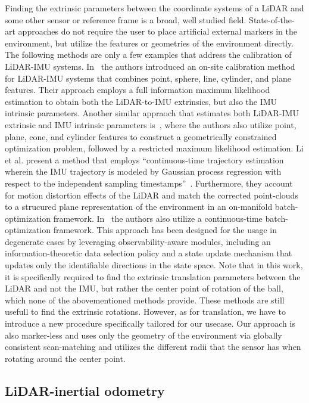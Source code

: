 Finding the extrinsic parameters between the coordinate systems of a LiDAR and some other sensor or reference frame is a broad, well studied field.
State-of-the-art approaches do not require the user to place artificial external markers in the environment, but utilize the features or geometries of the environment directly.
The following methods are only a few examples that address the calibration of LiDAR-IMU systems.
In~\cite{Liu2020NovelMultifeature} the authors introduced an on-site calibration method for LiDAR-IMU systems that combines point, sphere, line, cylinder, and plane features.
Their approach employs a full information maximum likelihood estimation to obtain both the LiDAR-to-IMU extrinsics, but also the IMU intrinsic parameters.
Another similar appraoch that estimates both LiDAR-IMU extrinsic and IMU intrinsic parameters is~\cite{Liu2019ErrorModeling}, where the authors also utilize point, plane, cone, and cylinder features to construct a geometrically constrained optimization problem, followed by a restricted maximum likelihood estimation.
Li et al. present a method that employs ``continuous-time trajectory estimation wherein the IMU trajectory is modeled by Gaussian process regression with respect to the independent sampling timestamps''~\cite{Li2021CTTrajectory}.
Furthermore, they account for motion distortion effects of the LiDAR and match the corrected point-clouds to a strucured plane representation of the environment in an on-manifold batch-optimization framework.
In~\cite{Lv2022ObservabilityAware} the authors also utilize a continuous-time batch-optimization framework.
This approach has been designed for the usage in degenerate cases by leveraging observability-aware modules, including an information-theoretic data selection policy and a state update mechanism that updates only the identifiable directions in the state space.
Note that in this work, it is specifically required to find the extrinsic translation parameters between the LiDAR and not the IMU, but rather the center point of rotation of the ball, which none of the abovementioned methods provide. 
These methods are still usefull to find the extrinsic rotations.
However, as for translation, we have to introduce a new procedure specifically tailored for our usecase.
Our approach is also marker-less and uses only the geometry of the environment via globally consistent scan-matching and utilizes the different radii that the sensor has when rotating around the center point.

\subsection{LiDAR-inertial odometry}

